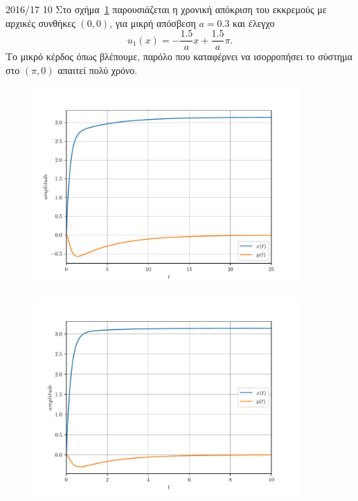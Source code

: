 \begin{solution}{2016/17 10}
    Στο σχήμα~\ref{fig:ex10_invPend15a} παρουσιάζεται η χρονική απόκριση του
    εκκρεμούς με αρχικές συνθήκες \( (0, 0) \), για μικρή απόσβεση \( a = 0.3 \)
    και έλεγχο
    \[
        u_1(x) = -\frac{1.5}{a}x + \frac{1.5}{a}\pi.
    \]
    Το μικρό κέρδος όπως βλέπουμε, παρόλο που καταφέρνει να ισορροπήσει το
    σύστημα στο \( (\pi, 0) \) απαιτεί πολύ χρόνο.
    \begin{figure}[h!]
        \centering
        \includegraphics[width=0.9\textwidth]{figures/ex10_invPend15a.pdf}
        \caption{}
        \label{fig:ex10_invPend15a}
    \end{figure}
    \begin{figure}[h!]
        \centering
        \includegraphics[width=0.9\textwidth]{figures/ex10_invPend35a.pdf}
        \caption{}
\end{figure}
\end{solution}

